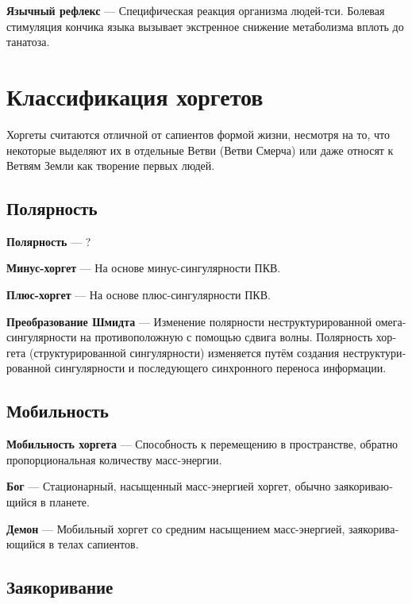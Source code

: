 \documentclass[a4paper,12pt,fleqn]{book}\usepackage{cooltooltips}\usepackage{polyglossia}\setdefaultlanguage[babelshorthands=true]{russian}\setotherlanguage{english}\defaultfontfeatures{Ligatures=TeX,Mapping=tex-text} \usepackage{xcolor}\definecolor{lightgray}{HTML}{bbbbbb}\color{lightgray}\newcommand{\ml}[3]{\textenglish{\textcolor{black}{#3}}}
\newcommand{\asterism}{\vspace{1em}{\centering\Large\bfseries$\ast~\ast~\ast$\par}\vspace{1em}}
\newcommand{\theterm}[3]{\textbf{\hypertarget{#1}{#2}} --- #3}
\begin{document}
\theterm{lingual-reflex}
{Язычный рефлекс}
{Специфическая реакция организма людей-тси.
Болевая стимуляция кончика языка вызывает экстренное снижение метаболизма вплоть до танатоза.}

\chapter{Классификация хоргетов}

Хоргеты считаются отличной от сапиентов формой жизни, несмотря на то, что некоторые выделяют их в отдельные Ветви (Ветви Смерча) или даже относят к Ветвям Земли как творение первых людей.

\section{Полярность}

\theterm{polarity}
{Полярность}
{?}

\asterism

\theterm{minus-jorget}
{Минус-хоргет}
{На основе минус-сингулярности ПКВ.}

\theterm{plus-jorget}
{Плюс-хоргет}
{На основе плюс-сингулярности ПКВ.}

\theterm{schmidt-transformation}
{Преобразование Шмидта}
{Изменение полярности неструктурированной омега-сингулярности на противоположную с помощью сдвига волны.
Полярность хоргета (структурированной сингулярности) изменяется путём создания неструктурированной сингулярности и последующего синхронного переноса информации.}

\section{Мобильность}

\theterm{mobility}
{Мобильность хоргета}
{Способность к перемещению в пространстве, обратно пропорциональная количеству масс-энергии.}

\asterism

\theterm{god}
{Бог}
{Стационарный, насыщенный масс-энергией хоргет, обычно заякоривающийся в планете.}

\theterm{daemon}
{Демон}
{Мобильный хоргет со средним насыщением масс-энергией, заякоривающийся в телах сапиентов.}

\section{Заякоривание}
\end{document}
